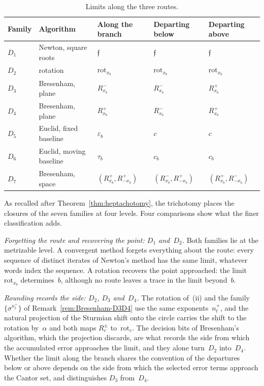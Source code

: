 \documentclass[psamsfonts]{amsart}
\theoremstyle{definition}
\theoremstyle{remark}
\numberwithin{equation}{section}
\begin{document}
\begin{table}[ht]
  \centering
  \small
  \renewcommand{\arraystretch}{1.25}
  \begin{tabular}{>{\raggedright\arraybackslash}p{1.1cm}>{\raggedright\arraybackslash}p{2.4cm}>{\raggedright\arraybackslash}p{2.45cm}>{\raggedright\arraybackslash}p{2.45cm}>{\raggedright\arraybackslash}p{2.45cm}}
    \hline
    Family & Algorithm & Along the branch & Departing below & Departing above \\
    \hline
    $D_1$ & Newton, square roots & $\mathfrak{f}$ & $\mathfrak{f}$ & $\mathfrak{f}$ \\
    $D_2$ & rotation & $\mathrm{rot}_{x_b}$ & $\mathrm{rot}_{x_b}$ & $\mathrm{rot}_{x_b}$ \\
    $D_3$ & Bresenham, plane & $R^-_{x_b}$ & $R^-_{x_b}$ & $R^+_{x_b}$ \\
    $D_4$ & Bresenham, plane & $R^+_{x_b}$ & $R^-_{x_b}$ & $R^+_{x_b}$ \\
    $D_5$ & Euclid, fixed baseline & $\varepsilon_b$ & $c$ & $c$ \\
    $D_6$ & Euclid, moving baseline & $\tau_b$ & $c_b$ & $c_b$ \\
    $D_7$ & Bresenham, space & $(R^+_{x_b},R^+_{-x_b})$ & $(R^-_{x_b},R^+_{-x_b})$ & $(R^+_{x_b},R^-_{-x_b})$ \\
    \hline
  \end{tabular}
  \vspace{6pt}
  \caption{Limits along the three routes.}
  \label{tab:hepta-routes}
\end{table}

As recalled after Theorem~\ref{thm:heptachotomy}, the trichotomy places the closures of the seven families at four levels.
Four comparisons show what the finer classification adds.

\emph{Forgetting the route and recovering the point: $D_1$ and~$D_2$.}
Both families lie at the metrizable level.
A convergent method forgets everything about the route: every sequence of distinct iterates of Newton's method has the same limit, whatever words index the sequence.
A rotation recovers the point approached: the limit $\mathrm{rot}_{x_b}$ determines~$b$, although no route leaves a trace in the limit beyond~$b$.

\emph{Rounding records the side: $D_2$, $D_3$ and~$D_4$.}
The rotation of~(ii) and the family $\{\sigma^{n_t^+}\}$ of Remark~\ref{rem:Bresenham-D3D4} use the same exponents~$n_t^+$, and the natural projection of the Sturmian shift onto the circle carries the shift to the rotation by~$\alpha$ and both maps $R^\pm_c$ to~$\mathrm{rot}_c$.
The decision bits of Bresenham's algorithm, which the projection discards, are what records the side from which the accumulated error approaches the limit, and they alone turn~$D_2$ into~$D_4$.
Whether the limit along the branch shares the convention of the departures below or above depends on the side from which the selected error terms approach the Cantor set, and distinguishes $D_3$ from~$D_4$.
\end{document}
